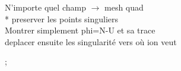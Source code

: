 N'importe quel champ $\longrightarrow$  mesh quad\\*
preserver les points singuliers\\
Montrer simplement phi=N-U et sa trace\\
deplacer ensuite les singularité vers où ion veut

;
